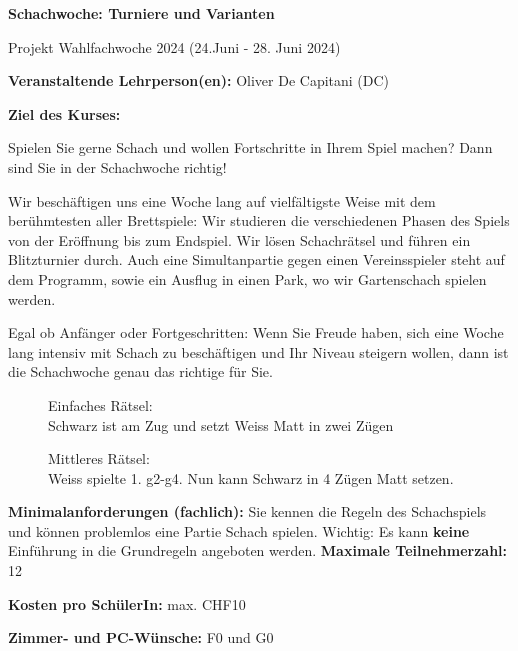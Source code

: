 \documentclass[12pt]{article}
\begin{document}


 
        \Large
        \textbf{Schachwoche: Turniere und Varianten}
 \vspace*{0.3cm}
 
         \Large
Projekt Wahlfachwoche 2024 (24.Juni - 28. Juni 2024) 
 \normalsize
 
 \vfill
 
        \textbf{Veranstaltende Lehrperson(en):} Oliver De Capitani (DC)
 
        \vfill
        
\textbf{Ziel des Kurses:}

Spielen Sie gerne Schach und wollen Fortschritte in Ihrem Spiel machen? Dann sind Sie in der Schachwoche richtig!

Wir beschäftigen uns eine Woche lang auf vielfältigste Weise mit dem berühmtesten aller Brettspiele: Wir studieren die verschiedenen Phasen des Spiels von der Eröffnung bis zum Endspiel. Wir lösen Schachrätsel und führen ein Blitzturnier durch. Auch eine Simultanpartie gegen einen Vereinsspieler steht auf dem Programm, sowie ein Ausflug in einen Park, wo wir Gartenschach spielen werden.	

Egal ob Anfänger oder Fortgeschritten: Wenn Sie Freude haben, sich eine Woche lang intensiv mit Schach zu beschäftigen und Ihr Niveau steigern wollen, dann ist die Schachwoche genau das richtige für Sie.

\begin{multicols}{2}
\begin{figure}[H]
\centering
\chessboard[smallboard,
setfen=8/8/6pp/8/6PK/5k1P/8/8 b - - 0 45,
]
\caption{Einfaches Rätsel: \\ Schwarz ist am Zug und setzt Weiss Matt in zwei Zügen}
\end{figure}

\begin{figure}[H]
\centering
\chessboard[smallboard,
setfen=6r1/5Q2/7k/p1PpBpq1/3P2Pp/2P2P1P/P6K/8 b - g3 0 1,
]
\caption{Mittleres Rätsel: \\ Weiss spielte 1. g2-g4. Nun kann Schwarz in 4 Zügen Matt setzen.}
\end{figure}
\end{multicols}
 
 		\vfill
 		
 		\textbf{Minimalanforderungen (fachlich):} Sie kennen die Regeln des Schachspiels und können problemlos eine Partie Schach spielen. Wichtig: Es kann {\bf keine} Einführung in die Grundregeln angeboten werden. 
\vfill
\textbf{Maximale Teilnehmerzahl:} 12

\vfill
\textbf{Kosten pro SchülerIn:}	max. CHF10


\vfill

\textbf{Zimmer- und PC-Wünsche:} F0 und G0
                 
\end{document}
